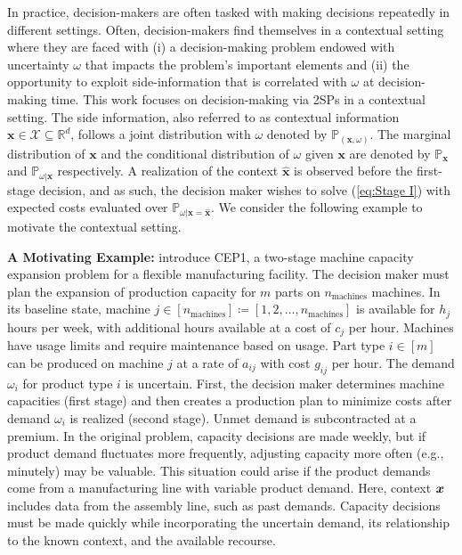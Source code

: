In practice, decision-makers are often tasked with making decisions repeatedly in different settings. Often, decision-makers find themselves in a contextual setting where they are faced with (i) a decision-making problem endowed with uncertainty $\omega$ that impacts the problem's important elements and (ii) the opportunity to exploit side-information that is correlated with $\omega$ at decision-making time. This work focuses on decision-making via 2SPs in a contextual setting. The side information, also referred to as contextual information $\boldsymbol{x} \in \mathcal{X} \subseteq \mathbb{R}^d$, follows a joint distribution with $\omega$ denoted by $\mathbb{P}_{(\boldsymbol{x}, \omega)}$. The marginal distribution of $\boldsymbol{x}$ and the conditional distribution of $\omega$ given $\boldsymbol{x}$ are denoted by $\mathbb{P}_{\boldsymbol{x}}$ and $\mathbb{P}_{\omega|\boldsymbol{x}}$ respectively. A realization of the context $\hat{\boldsymbol{x}}$ is observed before the first-stage decision, and as such, the decision maker wishes to solve (\ref{eq:Stage I}) with expected costs evaluated over $\mathbb{P}_{\omega|\boldsymbol{x} = \hat{\boldsymbol{x}}}$. We consider the following example to motivate the contextual setting. 

  \noindent \textbf{A Motivating Example:}  \citet{higle_sen_1996} introduce CEP1, a two-stage machine capacity expansion problem for a flexible manufacturing facility. The decision maker must plan the expansion of production capacity for $m$ parts on $n_{\text{machines}}$ machines. In its baseline state, machine $j \in [n_{\text{machines}}]  \coloneq [1,2,\hdots, n_{\text{machines}}]$ is available for $h_j$ hours per week, with additional hours available at a cost of $c_j$ per hour. Machines have usage limits and require maintenance based on usage. Part type $i \in [m]$ can be produced on machine $j$ at a rate of $a_{ij}$ with cost $g_{ij}$ per hour. The demand $\omega_{i}$ for product type $i$ is uncertain. First, the decision maker determines machine capacities (first stage) and then creates a production plan to minimize costs after demand $\omega_i$ is realized (second stage). Unmet demand is subcontracted at a premium. In the original problem, capacity decisions are made weekly, but if product demand fluctuates more frequently, adjusting capacity more often (e.g., minutely) may be valuable. This situation could arise if the product demands come from a manufacturing line with variable product demand. Here, context $\boldsymbol{x}$ includes data from the assembly line, such as past demands. Capacity decisions must be made quickly while incorporating the uncertain demand, its relationship to the known context, and the available recourse.
    
